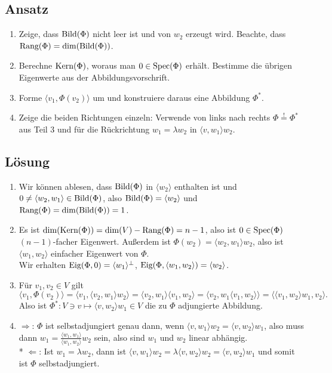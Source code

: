 \subsection{Ansatz}
\begin{enumerate}
	\item Zeige, dass \( \text{Bild}(\Phi) \) nicht leer ist und von \( w_2 \) erzeugt wird. Beachte, dass \( \text{Rang}(\Phi) = \dim(\text{Bild}(\Phi)) \).
	\item Berechne \( \text{Kern}(\Phi) \), woraus man \( 0 \in \text{Spec}(\Phi) \) erhält. Bestimme die übrigen Eigenwerte aus der Abbildungsvorschrift.
	\item Forme \( \langle v_1, \Phi(v_2) \rangle \) um und konstruiere daraus eine Abbildung \( \Phi^\ast \).
	\item Zeige die beiden Richtungen einzeln: Verwende von links nach rechts \( \Phi \overset{\text{!}}{=} \Phi^\ast \) aus Teil 3 und für die Rückrichtung \( w_1 = \lambda w_2 \) in \( \langle v,w_1 \rangle w_2 \).
\end{enumerate}

\subsection{Lösung}
\begin{enumerate}
	\item Wir können ablesen, dass \( \text{Bild}(\Phi) \) in \( \langle w_2 \rangle \) enthalten ist und \( 0 \neq \langle w_2,w_1 \rangle \in \text{Bild}(\Phi) \), also \( \text{Bild}(\Phi) = \langle w_2 \rangle \) und \( \text{Rang}(\Phi) = \dim(\text{Bild}(\Phi)) = 1 \).
	\item Es ist \( \dim(\text{Kern}(\Phi)) = \dim(V) - \text{Rang}(\Phi) = n-1 \), also ist \( 0 \in \text{Spec}(\Phi) \) \( (n-1) \)-facher Eigenwert. Außerdem ist \( \Phi(w_2) = \langle w_2,w_1 \rangle w_2 \), also ist \( \langle w_1,w_2 \rangle \) einfacher Eigenwert von \( \Phi \). \\
	Wir erhalten \( \text{Eig}(\Phi,0) = \langle w_1 \rangle^\perp \), \( \text{Eig}(\Phi,\langle w_1,w_2 \rangle) = \langle w_2 \rangle \).
	\item Für \( v_1,v_2 \in V \) gilt
	\begin{equation*}
		\langle v_1, \Phi(v_2) \rangle = \langle v_1,\langle v_2,w_1 \rangle w_2 \rangle = \langle v_2,w_1 \rangle \langle v_1,w_2 \rangle = \langle v_2,w_1\langle v_1,w_2 \rangle \rangle = \langle \langle v_1,w_2 \rangle w_1,v_2 \rangle\text{.}
	\end{equation*}
	Also ist \( \Phi^\ast: V \ni v \mapsto \langle v,w_2 \rangle w_1 \in V \) die zu \( \Phi \) adjungierte Abbildung.

	\item \( \Rightarrow \): \( \Phi \) ist selbstadjungiert genau dann, wenn \( \langle v,w_1 \rangle w_2 = \langle v,w_2 \rangle w_1 \), also muss dann \( w_1 = \tfrac{\langle w_1,w_1 \rangle}{\langle w_1,w_2 \rangle}w_2 \) sein, also sind \( w_1 \) und \( w_2 \) linear abhängig. \\*
	\( \Leftarrow \): Ist \( w_1 = \lambda w_2 \), dann ist \( \langle v,w_1 \rangle w_2 = \lambda \langle v,w_2 \rangle w_2 = \langle v,w_2 \rangle w_1 \) und somit ist \( \Phi \) selbstadjungiert.
\end{enumerate}

